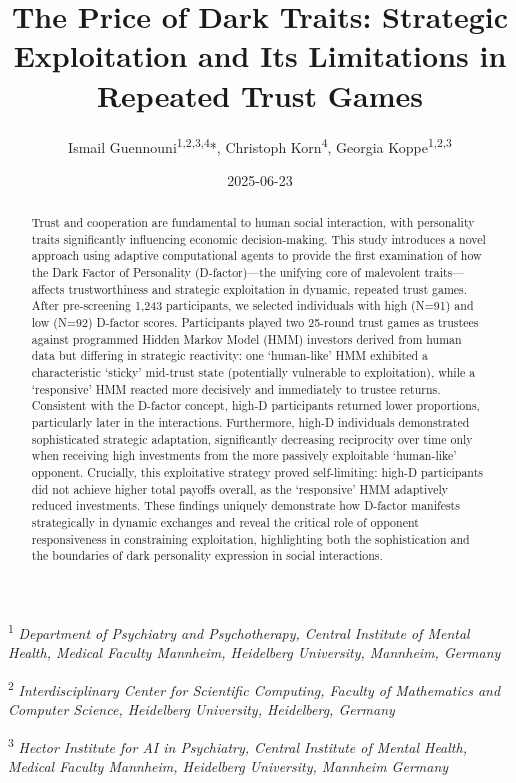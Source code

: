 \documentclass[
]{article}
\title{The Price of Dark Traits: Strategic Exploitation and Its Limitations in Repeated Trust Games}
\author{Ismail Guennouni\textsuperscript{1,2,3,4}*, Christoph Korn\textsuperscript{4}, Georgia Koppe\textsuperscript{1,2,3}}
\date{2025-06-23}
\begin{document}
\maketitle
\begin{abstract}
Trust and cooperation are fundamental to human social interaction, with personality traits significantly influencing economic decision-making. This study introduces a novel approach using adaptive computational agents to provide the first examination of how the Dark Factor of Personality (D-factor)---the unifying core of malevolent traits---affects trustworthiness and strategic exploitation in dynamic, repeated trust games. After pre-screening 1,243 participants, we selected individuals with high (N=91) and low (N=92) D-factor scores. Participants played two 25-round trust games as trustees against programmed Hidden Markov Model (HMM) investors derived from human data but differing in strategic reactivity: one `human-like' HMM exhibited a characteristic `sticky' mid-trust state (potentially vulnerable to exploitation), while a `responsive' HMM reacted more decisively and immediately to trustee returns. Consistent with the D-factor concept, high-D participants returned lower proportions, particularly later in the interactions. Furthermore, high-D individuals demonstrated sophisticated strategic adaptation, significantly decreasing reciprocity over time only when receiving high investments from the more passively exploitable `human-like' opponent. Crucially, this exploitative strategy proved self-limiting: high-D participants did not achieve higher total payoffs overall, as the `responsive' HMM adaptively reduced investments. These findings uniquely demonstrate how D-factor manifests strategically in dynamic exchanges and reveal the critical role of opponent responsiveness in constraining exploitation, highlighting both the sophistication and the boundaries of dark personality expression in social interactions.
\end{abstract}

\small

\textsuperscript{1} \emph{Department of Psychiatry and Psychotherapy, Central Institute of
Mental Health, Medical Faculty Mannheim, Heidelberg University,
Mannheim, Germany}

\textsuperscript{2} \emph{Interdisciplinary Center for Scientific Computing, Faculty of
Mathematics and Computer Science, Heidelberg University, Heidelberg,
Germany}

\textsuperscript{3} \emph{Hector Institute for AI in Psychiatry, Central Institute of Mental
Health, Medical Faculty Mannheim, Heidelberg University, Mannheim
Germany}
\end{document}
